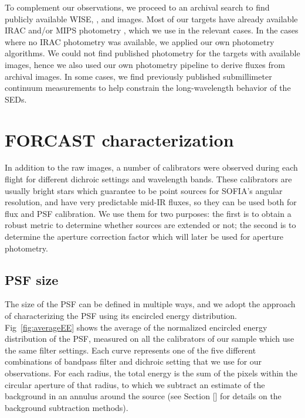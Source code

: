 To complement our observations, we proceed to an archival search to find publicly available WISE, \Spitzer, and \Herschel images. Most of our targets have already available \Spitzer IRAC and/or MIPS photometry \citep[mostly from][]{Gutermuth:2009gca,Megeath:2012cn,Evans:2009bka}, which we use in the relevant cases. In the cases where no IRAC photometry was available, we applied our own photometry algorithms. We could not find published photometry for the targets with available \Herschel images, hence we also used our own photometry pipeline to derive fluxes from archival images. In some cases, we find previously published submillimeter continuum measurements to help constrain the long-wavelength behavior of the SEDs.


\section{FORCAST characterization}

In addition to the raw images, a number of calibrators were observed during each flight for different dichroic settings and wavelength bands. These calibrators are usually bright stars which guarantee to be point sources for SOFIA's angular resolution, and have very predictable mid-IR fluxes, so they can be used both for flux and PSF calibration. We use them for two purposes: the first is to obtain a robust metric to determine whether sources are extended or not; the second is to determine the aperture correction factor which will later be used for aperture photometry. 

\subsection{PSF size}
The size of the PSF can be defined in multiple ways, and we adopt the approach of characterizing the PSF using its encircled energy distribution. Fig~\ref{fig:averageEE} shows the average of the normalized encircled energy distribution of the PSF, measured on all the calibrators of our sample which use the same filter settings. Each curve represents one of the five different combinations of bandpass filter and dichroic setting that we use for our observations. For each radius, the total energy is the sum of the pixels within the circular aperture of that radius, to which we subtract an estimate of the background in an annulus around the source (see Section [] for details on the background subtraction methods). 

